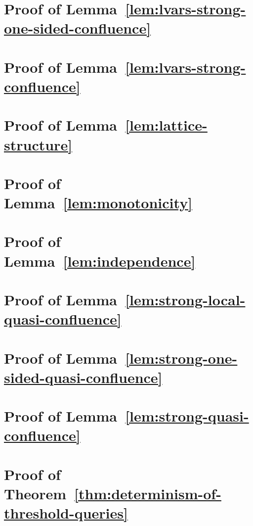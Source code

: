 \section{Proof of Lemma~\ref{lem:lvars-strong-one-sided-confluence}}\label{section:lvars-strong-one-sided-confluence-proof}


\section{Proof of Lemma~\ref{lem:lvars-strong-confluence}}\label{section:lvars-strong-confluence-proof}


\section{Proof of Lemma~\ref{lem:lattice-structure}}\label{section:lattice-structure-proof}


\section{Proof of Lemma~\ref{lem:monotonicity}}\label{section:monotonicity-proof}


\section{Proof of Lemma~\ref{lem:independence}}\label{section:independence-proof}


\section{Proof of Lemma~\ref{lem:strong-local-quasi-confluence}}\label{section:strong-local-quasi-confluence-proof}


\section{Proof of Lemma~\ref{lem:strong-one-sided-quasi-confluence}}\label{section:strong-one-sided-quasi-confluence-proof}


\section{Proof of Lemma~\ref{lem:strong-quasi-confluence}}\label{section:strong-quasi-confluence-proof}


\section{Proof of Theorem~\ref{thm:determinism-of-threshold-queries}}\label{section:determinism-of-threshold-queries-proof}


